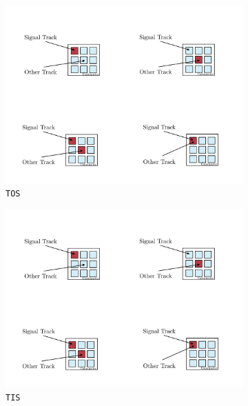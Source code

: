 \begin{figure}[!h]
    \centering
    \begin{subfigure}[t]{0.4\textwidth}
        \includegraphics[width=1.0\textwidth]{figs/Selection/Tos.pdf}
        \caption{\texttt{TOS}}
        \label{fig:TOS}
    \end{subfigure}%
    \begin{subfigure}[t]{0.4\textwidth}
        \includegraphics[width=1.0\textwidth]{figs/Selection/Tis.pdf}
        \caption{\texttt{TIS}}
        \label{fig:TIS}
    \end{subfigure}\\
    \begin{subfigure}[t]{0.4\textwidth}

\end{subfigure}
\end{figure}
